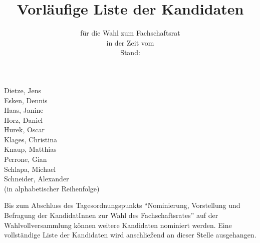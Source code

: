 \documentclass[a4paper,10pt]{scrartcl}
\title{Vorläufige Liste der Kandidaten}
\subtitle{für die Wahl zum Fachschaftsrat \fach \\ in der Zeit vom \zeit\\Stand: \stand}
\date{}
\begin{document}
\pagestyle{empty}
\thispagestyle{empty}
\renewcommand{\titlepagestyle}{empty}

\maketitle

\begin{center}
\Huge
Dietze, Jens\\
Esken, Dennis\\
Haas, Janine\\
Horz, Daniel\\
Hurek, Oscar\\
Klages, Christina\\
Knaup, Matthias\\
Perrone, Gian\\
Schlapa, Michael\\
Schneider, Alexander\\
\small
(in alphabetischer Reihenfolge)
\end{center}

Bis zum Abschluss des Tagesordnungspunkts ``Nominierung, Vorstellung und Befragung der KandidatInnen zur Wahl des Fachschaftsrates'' auf der Wahlvollversammlung können weitere Kandidaten nominiert werden. Eine vollständige Liste der Kandidaten wird anschließend an dieser Stelle ausgehangen.
\end{document}
